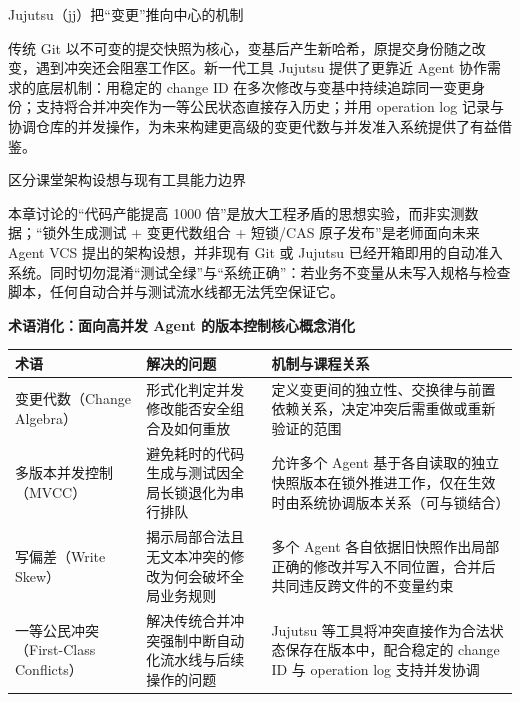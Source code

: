 \documentclass[UTF8,a4paper,11pt,fontset=fandol]{ctexart}
\begin{document}
\begin{knowledgebox}{Jujutsu（jj）把“变更”推向中心的机制}

传统 Git 以不可变的提交快照为核心，变基后产生新哈希，原提交身份随之改变，遇到冲突还会阻塞工作区。新一代工具 Jujutsu 提供了更靠近 Agent 协作需求的底层机制：用稳定的 change ID 在多次修改与变基中持续追踪同一变更身份；支持将合并冲突作为一等公民状态直接存入历史；并用 operation log 记录与协调仓库的并发操作，为未来构建更高级的变更代数与并发准入系统提供了有益借鉴。

\end{knowledgebox}

\begin{warningbox}{区分课堂架构设想与现有工具能力边界}

本章讨论的“代码产能提高 1000 倍”是放大工程矛盾的思想实验，而非实测数据；“锁外生成测试 + 变更代数组合 + 短锁/CAS 原子发布”是老师面向未来 Agent VCS 提出的架构设想，并非现有 Git 或 Jujutsu 已经开箱即用的自动准入系统。同时切勿混淆“测试全绿”与“系统正确”：若业务不变量从未写入规格与检查脚本，任何自动合并与测试流水线都无法凭空保证它。

\end{warningbox}

\par{}\textbf{术语消化：面向高并发 Agent 的版本控制核心概念消化}

\begin{center}\small\begin{tabularx}{\linewidth}{YYY}

\toprule

术语 & 解决的问题 & 机制与课程关系\\\midrule

变更代数（Change Algebra） & 形式化判定并发修改能否安全组合及如何重放 & 定义变更间的独立性、交换律与前置依赖关系，决定冲突后需重做或重新验证的范围\\[3pt]

多版本并发控制（MVCC） & 避免耗时的代码生成与测试因全局长锁退化为串行排队 & 允许多个 Agent 基于各自读取的独立快照版本在锁外推进工作，仅在生效时由系统协调版本关系（可与锁结合）\\[3pt]

写偏差（Write Skew） & 揭示局部合法且无文本冲突的修改为何会破坏全局业务规则 & 多个 Agent 各自依据旧快照作出局部正确的修改并写入不同位置，合并后共同违反跨文件的不变量约束\\[3pt]

一等公民冲突（First-Class Conflicts） & 解决传统合并冲突强制中断自动化流水线与后续操作的问题 & Jujutsu 等工具将冲突直接作为合法状态保存在版本中，配合稳定的 change ID 与 operation log 支持并发协调\\[3pt]

\bottomrule\end{tabularx}\end{center}
\end{document}
